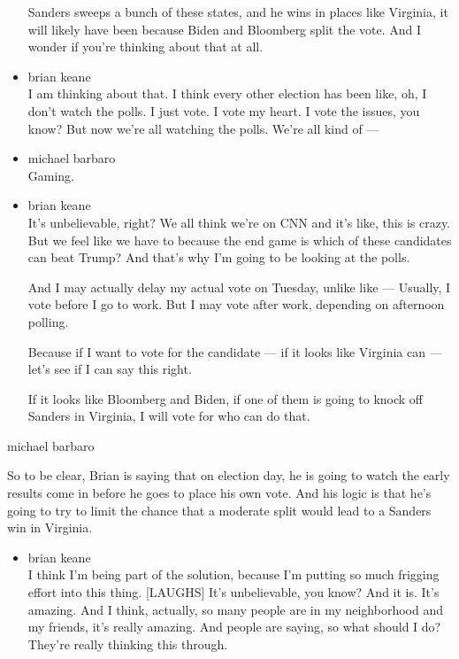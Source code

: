 \begin{itemize}
  Sanders sweeps a bunch of these states, and he wins in places like
  Virginia, it will likely have been because Biden and Bloomberg split
  the vote. And I wonder if you're thinking about that at all.
\item
  brian keane\\
  I am thinking about that. I think every other election has been like,
  oh, I don't watch the polls. I just vote. I vote my heart. I vote the
  issues, you know? But now we're all watching the polls. We're all kind
  of ---
\item
  michael barbaro\\
  Gaming.
\item
  brian keane\\
  It's unbelievable, right? We all think we're on CNN and it's like,
  this is crazy. But we feel like we have to because the end game is
  which of these candidates can beat Trump? And that's why I'm going to
  be looking at the polls.

  And I may actually delay my actual vote on Tuesday, unlike like ---
  Usually, I vote before I go to work. But I may vote after work,
  depending on afternoon polling.

  Because if I want to vote for the candidate --- if it looks like
  Virginia can --- let's see if I can say this right.

  If it looks like Bloomberg and Biden, if one of them is going to knock
  off Sanders in Virginia, I will vote for who can do that.
\end{itemize}

michael barbaro

So to be clear, Brian is saying that on election day, he is going to
watch the early results come in before he goes to place his own vote.
And his logic is that he's going to try to limit the chance that a
moderate split would lead to a Sanders win in Virginia.

\begin{itemize}
\tightlist
\item
  brian keane\\
  I think I'm being part of the solution, because I'm putting so much
  frigging effort into this thing. {[}LAUGHS{]} It's unbelievable, you
  know? And it is. It's amazing. And I think, actually, so many people
  are in my neighborhood and my friends, it's really amazing. And people
  are saying, so what should I do? They're really thinking this through.
\end{itemize}

